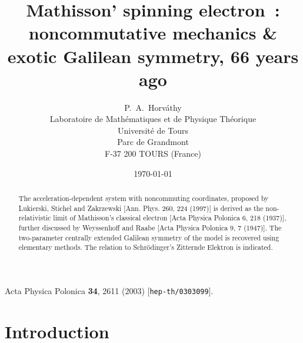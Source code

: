 \documentclass[a4paper,11pt]{article}
\let\ssection=\section
\renewcommand{\section}{\setcounter{equation}{0}\ssection}
\begin{document}
\setlength{\baselineskip}{16pt}

\title{Mathisson' spinning electron~:
  noncommutative mechanics \& exotic Galilean symmetry,
  66 years ago\\[8pt]
}
\author{
P.~A.~Horv\'athy
\\
Laboratoire de Math\'ematiques et de Physique Th\'eorique\\
Universit\'e de Tours\\
Parc de Grandmont\\
F-37 200 TOURS (France)
}

\date{\today}

\maketitle


\begin{abstract}
     The acceleration-dependent system with noncommuting coordinates,
     proposed by Lukierski, Stichel and Zakrzewski [Ann. Phys. 260,
     224 (1997)]
     is derived as the non-relativistic limit of Mathisson's
     classical electron [Acta Physica Polonica 6, 218 (1937)],
     further discussed by Weyssenhoff and Raabe
     [Acta Physica Polonica 9, 7 (1947)].
     The two-parameter centrally extended Galilean symmetry of
     the model is recovered using elementary methods.
     The relation to Schr\"odinger's Zitternde Elektron
     is indicated.
\end{abstract}




\noindent
Acta Physica Polonica {\bf 34}, 2611 (2003)
[\texttt{hep-th/0303099}].


\section{Introduction}
\end{document}
